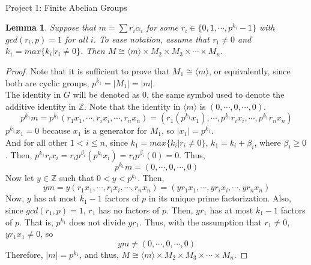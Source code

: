 \documentclass[a4paper,12pt]{article}
\begin{document}

\begin{center}
\mbox{} \\
{ \large Project 1: Finite Abelian Groups}
\end{center}

\onehalfspace

\newtheorem*{lemma}{Lemma}

\begin{lemma}
Suppose that $m=\sum{r_i \alpha_i}$ for some $r_i \in \{0,1,\cdots,p^{k_i}-1\}$ with $gcd(r_i,p)=1$ for all $i$.  To ease notation, assume that r$_1 \neq 0$ and $k_1 = max\{k_i | r_i \neq 0 \}$.  Then $M \cong \langle m \rangle \times M_2 \times M_3 \times \cdots \times M_n$.
\end{lemma}
\begin{proof}
Note that it is sufficient to prove that $M_1 \cong \langle m \rangle$, or equivalently, since both are cyclic groups, $p^{k_1} = |M_1| = |m|$. \\
The identity in $G$ will be denoted as $0$, the same symbol used to denote the additive identity in $\mathbb{Z}$.  Note that the identity in $\langle m \rangle$ is $(0,\cdots,0,\cdots,0)$.
\[ p^{k_1} m = p^{k_1} (r_1 x_1, \cdots, r_i x_i, \cdots, r_n x_n) = (r_1 (p^{k_1} x_1), \cdots, p^{k_1} r_i x_i, \cdots, p^{k_1} r_n x_n) \]
$p^{k_1} x_1 = 0$ because $x_1$ is a generator for $M_1$, so $|x_1|=p^{k_1}$. \\
And for all other $1 < i \leq n$, since $k_1 = max\{k_i | r_i \neq 0 \}$, $k_1 = k_i + \beta_i$, where $\beta_i \geq 0$. Then, $p^{k_1} r_i x_i = r_i p^{\beta_i} (p^{k_i} x_i) = r_i p^{\beta_i} (0) = 0$.  Thus,
\[ p^{k_1} m = (0,\cdots,0,\cdots,0) \]
Now let $y \in \mathbb{Z}$ such that $0<y<p^{k_1}$.  Then,
\[ y m = y (r_1 x_1, \cdots, r_i x_i, \cdots, r_n x_n) = (y r_1 x_1, \cdots, y r_i x_i, \cdots, y r_n x_n) \]
Now, $y$ has at most $k_1-1$ factors of $p$ in its unique prime factorization.  Also, since $gcd(r_1,p)=1$, $r_1$ has no factors of $p$.  Then, $y r_1$ has at most $k_1-1$ factors of $p$.  That is, $p^{k_1}$ does not divide $y r_1$.  Thus, with the assumption that $r_1 \neq 0$, $y r_1 x_1 \neq 0$, so
\[ y m \neq (0,\cdots,0,\cdots,0) \]
Therefore, $|m| = p^{k_1}$, and thus, $M \cong \langle m \rangle \times M_2 \times M_3 \times \cdots \times M_n$.
\end{proof}
\end{document}
